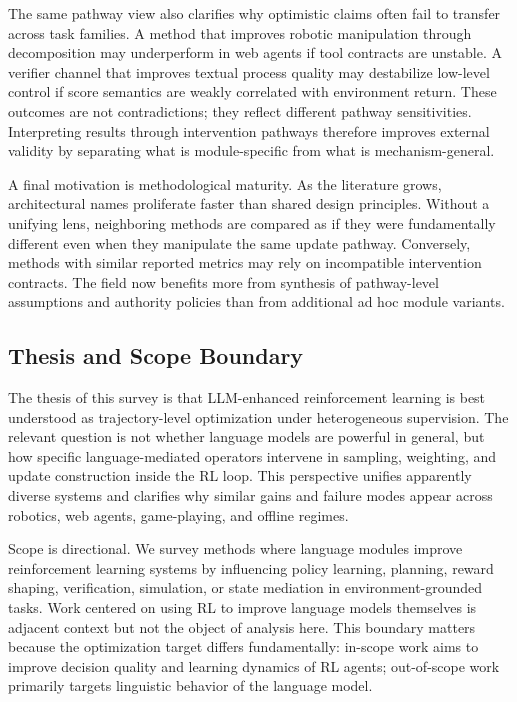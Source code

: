 \documentclass[pdflatex,sn-mathphys-num]{sn-jnl}
\begin{document}
The same pathway view also clarifies why optimistic claims often fail to transfer across task families. A method that improves robotic manipulation through decomposition may underperform in web agents if tool contracts are unstable. A verifier channel that improves textual process quality may destabilize low-level control if score semantics are weakly correlated with environment return. These outcomes are not contradictions; they reflect different pathway sensitivities. Interpreting results through intervention pathways therefore improves external validity by separating what is module-specific from what is mechanism-general.

A final motivation is methodological maturity. As the literature grows, architectural names proliferate faster than shared design principles. Without a unifying lens, neighboring methods are compared as if they were fundamentally different even when they manipulate the same update pathway. Conversely, methods with similar reported metrics may rely on incompatible intervention contracts. The field now benefits more from synthesis of pathway-level assumptions and authority policies than from additional ad hoc module variants.

\subsection{Thesis and Scope Boundary}
The thesis of this survey is that LLM-enhanced reinforcement learning is best understood as trajectory-level optimization under heterogeneous supervision. The relevant question is not whether language models are powerful in general, but how specific language-mediated operators intervene in sampling, weighting, and update construction inside the RL loop. This perspective unifies apparently diverse systems and clarifies why similar gains and failure modes appear across robotics, web agents, game-playing, and offline regimes.

Scope is directional. We survey methods where language modules improve reinforcement learning systems by influencing policy learning, planning, reward shaping, verification, simulation, or state mediation in environment-grounded tasks. Work centered on using RL to improve language models themselves is adjacent context but not the object of analysis here. This boundary matters because the optimization target differs fundamentally: in-scope work aims to improve decision quality and learning dynamics of RL agents; out-of-scope work primarily targets linguistic behavior of the language model.
\end{document}
